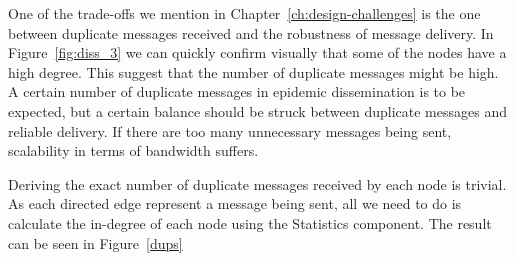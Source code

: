 One of the trade-offs we mention in Chapter~\ref{ch:design-challenges} is the one between duplicate
messages received and the robustness of message delivery. In
Figure~\ref{fig:diss_3} we can quickly confirm visually that some of the
nodes have a high degree. This suggest that the number of duplicate
messages might be high. A certain number of duplicate messages in
epidemic dissemination is to be expected, but a certain balance should
be struck between duplicate messages and reliable delivery. If there are
too many unnecessary messages being sent, scalability in terms of
bandwidth suffers.

Deriving the exact number of duplicate messages received by each node is
trivial. As each directed edge represent  a message being sent, all we
need to do is calculate the in-degree of each node using the Statistics
component. The result can be seen in Figure~\ref{dups}

